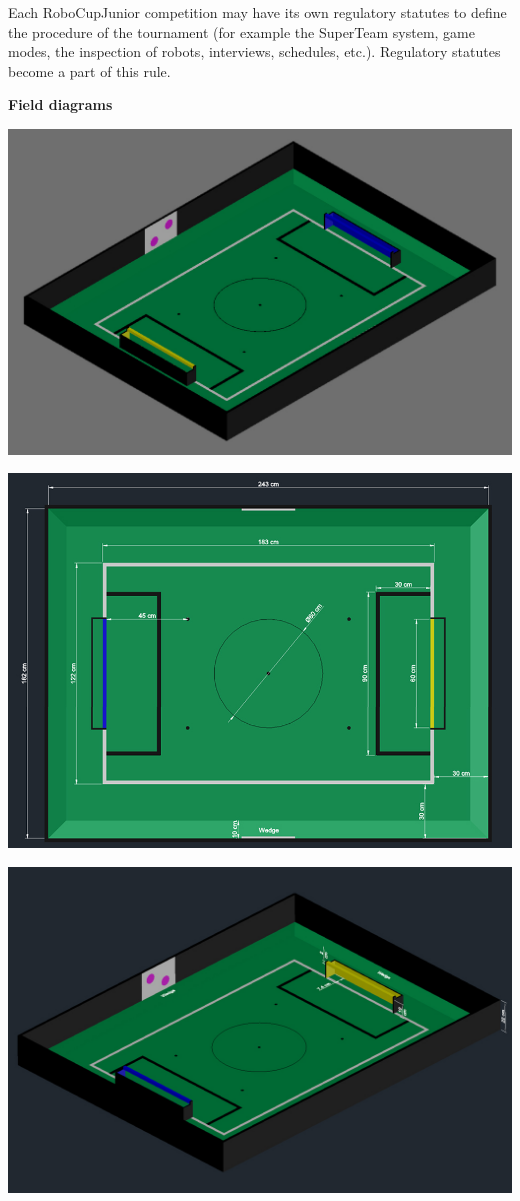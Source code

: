 \documentclass{article}
\begin{document}
Each RoboCupJunior competition may have its own regulatory statutes to define
the procedure of the tournament (for example the SuperTeam system, game modes,
the inspection of robots, interviews, schedules, etc.). Regulatory statutes
become a part of this rule.

\textbf{Field diagrams}

\includegraphics[width=1\textwidth]{media/image5_new.jpeg}

\includegraphics[width=1\textwidth]{media/image6_new.jpeg}

\includegraphics[width=1\textwidth]{media/image7_new.jpeg}
\end{document}
